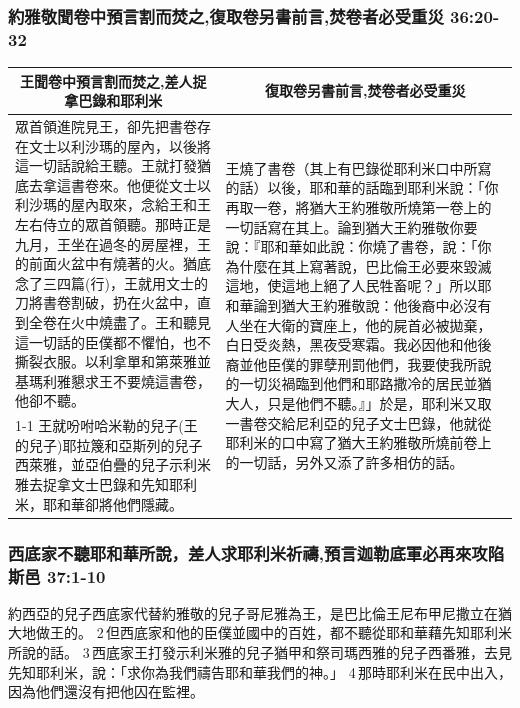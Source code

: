 \subsubsection{約雅敬聞卷中預言割而焚之,復取卷另書前言,焚卷者必受重災 36:20-32}
\begin{table}[H]
\centering
\begin{tabular}{p{8.5cm}|p{9.0cm}}\hline\hline
\multicolumn{1}{c|}{王聞卷中預言割而焚之,差人捉拿巴錄和耶利米}&\multicolumn{1}{c}{復取卷另書前言,焚卷者必受重災}\\\hline
眾首領進院見王，卻先把書卷存在文士以利沙瑪的屋內，以後將這一切話說給王聽。王就打發猶底去拿這書卷來。他便從文士以利沙瑪的屋內取來，念給王和王左右侍立的眾首領聽。那時正是九月，王坐在過冬的房屋裡，王的前面火盆中有燒著的火。猶底念了三四篇(行)，王就用文士的刀將書卷割破，扔在火盆中，直到全卷在火中燒盡了。王和聽見這一切話的臣僕都不懼怕，也不撕裂衣服。以利拿單和第萊雅並基瑪利雅懇求王不要燒這書卷，他卻不聽。
&\multirow{2}{9.4cm}{王燒了書卷（其上有巴錄從耶利米口中所寫的話）以後，耶和華的話臨到耶利米說：「你再取一卷，將猶大王約雅敬所燒第一卷上的一切話寫在其上。論到猶大王約雅敬你要說：『耶和華如此說：你燒了書卷，說：「你為什麼在其上寫著說，巴比倫王必要來毀滅這地，使這地上絕了人民牲畜呢？」所以耶和華論到猶大王約雅敬說：他後裔中必沒有人坐在大衛的寶座上，他的屍首必被拋棄，白日受炎熱，黑夜受寒霜。我必因他和他後裔並他臣僕的罪孽刑罰他們，我要使我所說的一切災禍臨到他們和耶路撒冷的居民並猶大人，只是他們不聽。』」於是，耶利米又取一書卷交給尼利亞的兒子文士巴錄，他就從耶利米的口中寫了猶大王約雅敬所燒前卷上的一切話，另外又添了許多相仿的話。}\\\cline{1-1}
王就吩咐哈米勒的兒子(王的兒子)耶拉篾和亞斯列的兒子西萊雅，並亞伯疊的兒子示利米雅去捉拿文士巴錄和先知耶利米，耶和華卻將他們隱藏。
&\\\hline
\end{tabular}
\end{table}
 


\subsubsection{西底家不聽耶和華所說，差人求耶利米祈禱,預言迦勒底軍必再來攻陷斯邑 37:1-10}
約西亞的兒子西底家代替約雅敬的兒子哥尼雅為王，是巴比倫王尼布甲尼撒立在猶大地做王的。 2 但西底家和他的臣僕並國中的百姓，都不聽從耶和華藉先知耶利米所說的話。
3 西底家王打發示利米雅的兒子猶甲和祭司瑪西雅的兒子西番雅，去見先知耶利米，說：「求你為我們禱告耶和華我們的神。」 4 那時耶利米在民中出入，因為他們還沒有把他囚在監裡。

